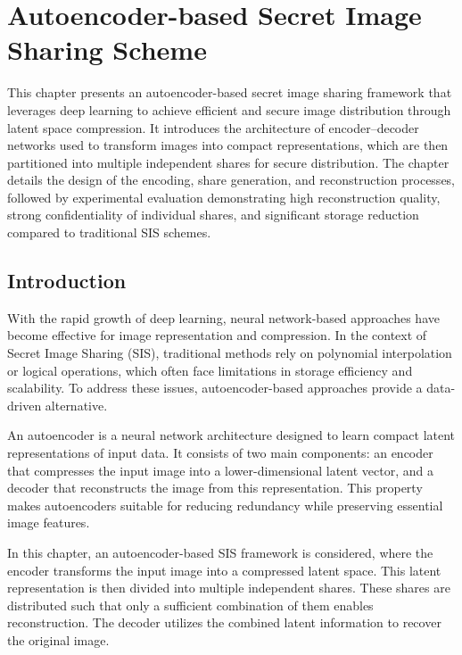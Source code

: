 \chapter{Autoencoder-based Secret Image Sharing Scheme}

This chapter presents an autoencoder-based secret image sharing framework that leverages deep learning to achieve efficient and secure image distribution through latent space compression. It introduces the architecture of encoder–decoder networks used to transform images into compact representations, which are then partitioned into multiple independent shares for secure distribution. The chapter details the design of the encoding, share generation, and reconstruction processes, followed by experimental evaluation demonstrating high reconstruction quality, strong confidentiality of individual shares, and significant storage reduction compared to traditional SIS schemes.

\section{Introduction}

With the rapid growth of deep learning, neural network-based approaches have become effective for image representation and compression. In the context of Secret Image Sharing (SIS), traditional methods rely on polynomial interpolation or logical operations, which often face limitations in storage efficiency and scalability. To address these issues, autoencoder-based approaches provide a data-driven alternative.

An autoencoder is a neural network architecture designed to learn compact latent representations of input data. It consists of two main components: an encoder that compresses the input image into a lower-dimensional latent vector, and a decoder that reconstructs the image from this representation. This property makes autoencoders suitable for reducing redundancy while preserving essential image features.

In this chapter, an autoencoder-based SIS framework is considered, where the encoder transforms the input image into a compressed latent space. This latent representation is then divided into multiple independent shares. These shares are distributed such that only a sufficient combination of them enables reconstruction. The decoder utilizes the combined latent information to recover the original image.

